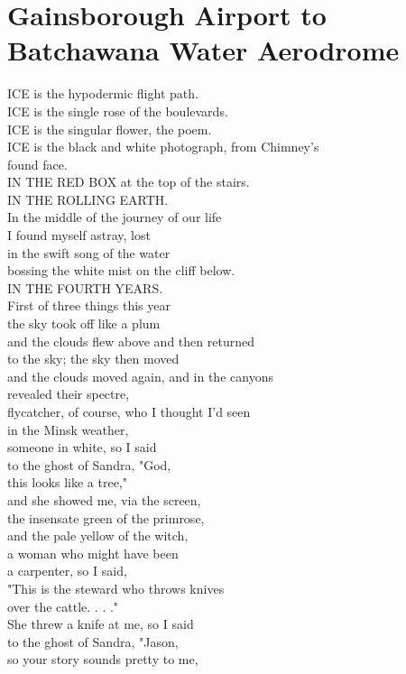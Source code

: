 \documentclass[smalldemyvopaper,11pt,twoside,onecolumn,openright,extrafontsizes]{memoir}
\begin{document}
\chapter{Gainsborough Airport to Batchawana Water Aerodrome}
ICE is the hypodermic flight path.
\\ICE is the single rose of the boulevards.
\\ICE is the singular flower, the poem.
\\ICE is the black and white photograph, from Chimney's
\\found face.
\\IN THE RED BOX at the top of the stairs.
\\IN THE ROLLING EARTH.
\\In the middle of the journey of our life
\\I found myself astray, lost
\\in the swift song of the water
\\bossing the white mist on the cliff below.
\\IN THE FOURTH YEARS.
\\First of three things this year
\\the sky took off like a plum
\\and the clouds flew above and then returned
\\to the sky; the sky then moved
\\and the clouds moved again, and in the canyons
\\revealed their spectre,
\\flycatcher, of course, who I thought I'd seen
\\in the Minsk weather,
\\someone in white, so I said
\\to the ghost of Sandra, "God,
\\this looks like a tree,"
\\and she showed me, via the screen,
\\the insensate green of the primrose,
\\and the pale yellow of the witch,
\\a woman who might have been
\\a carpenter, so I said,
\\"This is the steward who throws knives
\\over the cattle. . . ."
\\She threw a knife at me, so I said
\\to the ghost of Sandra, "Jason,
\\so your story sounds pretty to me,
\end{document}
